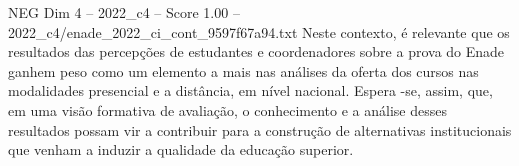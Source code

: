\begin{textsample}{NEG Dim 4 – 2022\_c4 – Score 1.00 – 2022\_c4/enade\_2022\_ci\_cont\_9597f67a94.txt}
Neste contexto, é relevante que os resultados das percepções de estudantes e coordenadores sobre a prova do Enade ganhem peso como um elemento a mais nas análises da oferta dos cursos nas modalidades presencial e a distância, em nível nacional.
Espera -se, assim, que, em uma visão formativa de avaliação, o conhecimento e a análise desses resultados possam vir a contribuir para a construção de alternativas institucionais que venham a induzir a qualidade da educação superior.

\end{textsample}
